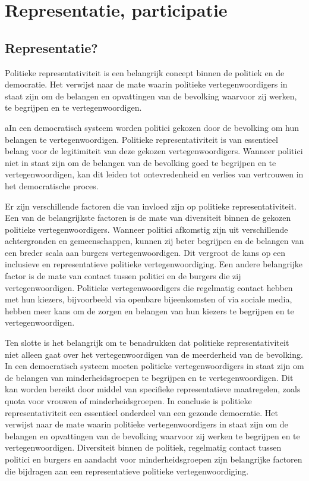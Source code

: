 \chapter{Representatie, participatie}

\section{Representatie?}
Politieke representativiteit is een belangrijk concept binnen de politiek en de democratie. Het verwijst naar de mate waarin politieke vertegenwoordigers in staat zijn om de belangen en opvattingen van de bevolking waarvoor zij werken, te begrijpen en te vertegenwoordigen.

aIn een democratisch systeem worden politici gekozen door de bevolking om hun belangen te vertegenwoordigen. Politieke representativiteit is van essentieel belang voor de legitimiteit van deze gekozen vertegenwoordigers. Wanneer politici niet in staat zijn om de belangen van de bevolking goed te begrijpen en te vertegenwoordigen, kan dit leiden tot ontevredenheid en verlies van vertrouwen in het democratische proces.

Er zijn verschillende factoren die van invloed zijn op politieke representativiteit. Een van de belangrijkste factoren is de mate van diversiteit binnen de gekozen politieke vertegenwoordigers. Wanneer politici afkomstig zijn uit verschillende achtergronden en gemeenschappen, kunnen zij beter begrijpen en de belangen van een breder scala aan burgers vertegenwoordigen. Dit vergroot de kans op een inclusieve en representatieve politieke vertegenwoordiging.
Een andere belangrijke factor is de mate van contact tussen politici en de burgers die zij vertegenwoordigen. Politieke vertegenwoordigers die regelmatig contact hebben met hun kiezers, bijvoorbeeld via openbare bijeenkomsten of via sociale media, hebben meer kans om de zorgen en belangen van hun kiezers te begrijpen en te vertegenwoordigen.

Ten slotte is het belangrijk om te benadrukken dat politieke representativiteit niet alleen gaat over het vertegenwoordigen van de meerderheid van de bevolking. In een democratisch systeem moeten politieke vertegenwoordigers in staat zijn om de belangen van minderheidsgroepen te begrijpen en te vertegenwoordigen. Dit kan worden bereikt door middel van specifieke representatieve maatregelen, zoals quota voor vrouwen of minderheidsgroepen.
In conclusie is politieke representativiteit een essentieel onderdeel van een gezonde democratie. Het verwijst naar de mate waarin politieke vertegenwoordigers in staat zijn om de belangen en opvattingen van de bevolking waarvoor zij werken te begrijpen en te vertegenwoordigen. Diversiteit binnen de politiek, regelmatig contact tussen politici en burgers en aandacht voor minderheidsgroepen zijn belangrijke factoren die bijdragen aan een representatieve politieke vertegenwoordiging.

